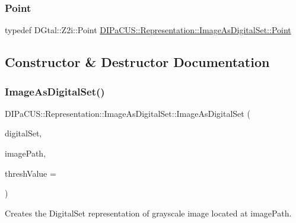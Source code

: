 \subsubsection{\texorpdfstring{Point}{Point}}
{\footnotesize\ttfamily typedef D\+Gtal\+::\+Z2i\+::\+Point \mbox{\hyperlink{structDIPaCUS_1_1Representation_1_1ImageAsDigitalSet_a16ad0b192ebf99b4d55bade91a62c847}{D\+I\+Pa\+C\+U\+S\+::\+Representation\+::\+Image\+As\+Digital\+Set\+::\+Point}}}



\subsection{Constructor \& Destructor Documentation}
\mbox{\label{structDIPaCUS_1_1Representation_1_1ImageAsDigitalSet_a7e40656e617812a4be262273cff996ea}} 
\subsubsection{\texorpdfstring{Image\+As\+Digital\+Set()}{ImageAsDigitalSet()}\hspace{0.1cm}{\footnotesize\ttfamily [1/2]}}
{\footnotesize\ttfamily D\+I\+Pa\+C\+U\+S\+::\+Representation\+::\+Image\+As\+Digital\+Set\+::\+Image\+As\+Digital\+Set (\begin{DoxyParamCaption}\item[{\mbox{\hyperlink{structDIPaCUS_1_1Representation_1_1ImageAsDigitalSet_a3a19b478392377afed24a5234dfdbd68}{Digital\+Set}} \&}]{digital\+Set,  }\item[{const std\+::string}]{image\+Path,  }\item[{int}]{thresh\+Value = {} }\end{DoxyParamCaption})}



Creates the Digital\+Set representation of grayscale image located at image\+Path. 


